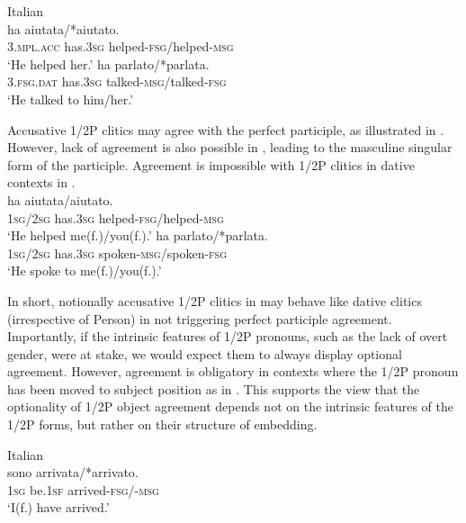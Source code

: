 \documentclass[output=paper,colorlinks,citecolor=brown,nonflat]{./langscibook}
\begin{document}
\ea%
    \label{ex:manzini:14}
    Italian\\
    \ea\label{ex:manzini:14a} 
         {ha}     {aiutata/*aiutato}.\\
        \textsc{3.mpl.acc}  has.\textsc{3sg}    helped-\textsc{fsg/}helped\textsc{{}-msg}\\
    \glt ‘He helped her.’
    \ex\label{ex:manzini:14b} 
           {ha}     {parlato/*parlata}.\\
        \textsc{3.fsg.dat}  has.\textsc{3sg}    talked-\textsc{msg/}talked\textsc{{}-fsg}\\
    \glt ‘He talked to him/her.’
    \z
\z
 
Accusative 1/2P clitics may agree with the perfect participle, as illustrated in . However, lack of agreement is also possible in , leading to the masculine singular form of the participle. Agreement is impossible with 1/2P clitics in dative contexts in .\\

\ea%
    \label{ex:manzini:15}
    \ea\label{ex:manzini:15a} 
         {ha}     {aiutata/aiutato}.\\
        \textsc{1sg/2sg}  has\textsc{.3sg}    helped\textsc{{}-fsg/}helped\textsc{{}-msg}\\
    \glt ‘He helped me(f.)/you(f.).’
\ex\label{ex:manzini:15b} 
            {ha}     {parlato/*parlata}.\\
        \textsc{1sg/2sg}  has\textsc{.3sg}    spoken\textsc{{}-msg/}spoken\textsc{{}-fsg}\\
    \glt ‘He spoke to me(f.)/you(f.).’
    \z
\z 

In short, notionally accusative 1/2P clitics in  may behave like dative clitics (irrespective of Person) in not triggering perfect participle agreement. Importantly, if the intrinsic features of 1/2P pronouns, such as the lack of overt gender, were at stake, we would expect them to always display optional agreement. However, agreement is obligatory in contexts where the 1/2P pronoun has been moved to subject position as in . This supports the view that the optionality of 1/2P object agreement depends not on the intrinsic features of the 1/2P forms, but rather on their structure of embedding.

\ea%
    \label{ex:manzini:16}
    Italian\\
      {sono}     {arrivata/*arrivato}.\\
        \textsc{1sg}  be.\textsc{1sf}   arrived\textsc{{}-fsg/-msg}\\
    \glt ‘I(f.) have arrived.’
\z
\end{document}

